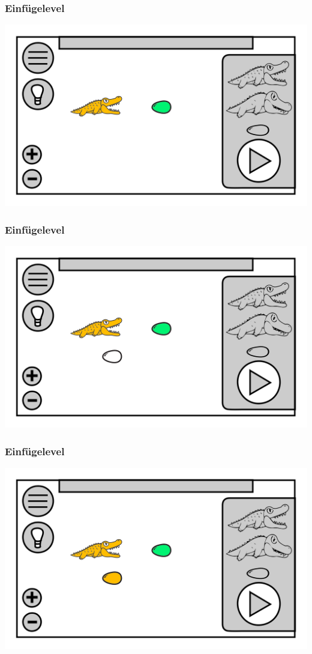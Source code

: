 \documentclass[t]{beamer}
\begin{document}
\begin{frame}
	\frametitle{Einfügelevel}
	\includegraphics[height=\textheight]{level_colored_croc.png}
\end{frame}
\begin{frame}
	\frametitle{Einfügelevel}
	\includegraphics[height=\textheight]{level_colored_croc0.png}
\end{frame}
\begin{frame}
	\frametitle{Einfügelevel}
	\includegraphics[height=\textheight]{level_colored_croc01.png}
\end{frame}
\end{document}
